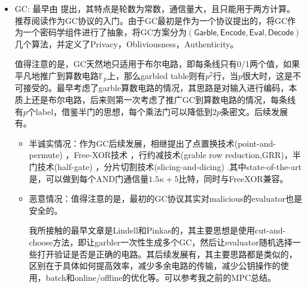 \documentclass[UTF8]{ctexart}
\theoremstyle{nonumberplain}
\theoremstyle{plain}
\begin{document}
\begin{itemize}
\item GC: 最早由 \cite{DBLP:conf/focs/Yao86}提出，其特点是轮数为常数，通信量大，且只能用于两方计算。推荐阅读\cite{DBLP:journals/eccc/ECCC-TR04-063}作为GC协议的入门。由于GC最初是作为一个协议提出的，\cite{DBLP:conf/ccs/BellareHR12}将GC作为一个密码学组件进行了抽象，将GC方案分为$(\mathsf{Garble},\mathsf{Encode},\mathsf{Eval},\mathsf{Decode})$几个算法，并定义了Privacy，Obliviousness，Authenticity。

值得注意的是，GC天然地只适用于布尔电路，即每条线只有0/1两个值，如果平凡地推广到算数电路$\mathbb{F}_p$上，那么garbled table则有$p^2$行，当$p$很大时，这是不可接受的。\cite{DBLP:conf/focs/ApplebaumIK11}最早考虑了garble算数电路的情况，其思路是对输入进行编码，本质上还是布尔电路，后来\cite{DBLP:conf/ccs/BallMR16}则第一次考虑了推广GC到算数电路的情况，每条线有$p$个label，借鉴半门的思想，每个乘法门可以降低到$2p$条密文。后续发展有\cite{DBLP:conf/asiacrypt/Ben-Efraim18,DBLP:journals/iacr/BallCMRS19,DBLP:journals/iacr/MakriW19}。
\begin{itemize}
\item 半诚实情况：作为GC后续发展，相继提出了点置换技术(point-and-permute) \cite{DBLP:conf/stoc/BeaverMR90}，Free-XOR技术 \cite{DBLP:conf/icalp/KolesnikovS08}，行约减技术(grable row reduction,GRR)\cite{DBLP:conf/sigecom/NaorPS99,DBLP:conf/asiacrypt/PinkasSSW09}，半门技术(half-gate) \cite{DBLP:conf/eurocrypt/ZahurRE15}，分片切割技术(slicing-and-dicing) \cite{DBLP:conf/crypto/RosulekR21}.其中state-of-the-art是\cite{DBLP:conf/crypto/RosulekR21}，可以做到每个AND门通信量$1.5\kappa+5$比特，同时与FreeXOR兼容。
\item 恶意情况：值得注意的是，最初的GC协议其实对malicious的evaluator也是安全的。{}

我所接触的最早文章是Lindell和Pinkas的\cite{DBLP:conf/eurocrypt/LindellP07}，其主要思想是使用cut-and-choose方法，即让garbler一次性生成多个GC，然后让evaluator随机选择一些打开验证是否是正确的电路。其后续发展有\cite{DBLP:conf/tcc/LindellP11,DBLP:conf/crypto/Lindell13,DBLP:conf/crypto/LindellR14,DBLP:conf/ccs/LindellR15,DBLP:conf/uss/RindalR16,DBLP:conf/eurocrypt/WangMK17}，其主要思路都是类似的，区别在于具体如何提高效率，减少多余电路的传输，减少公钥操作的使用，batch和online/offline的优化等。可以参考我之前的MPC总结。


\end{itemize}
\end{itemize}
\end{document}
